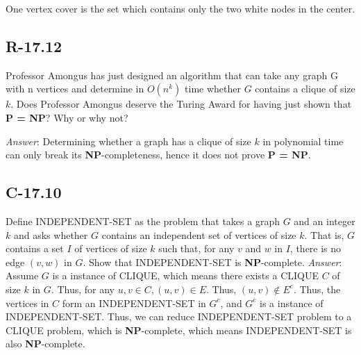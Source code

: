 \documentclass[11pt]{article}
\begin{document}
One vertex cover is the set which contains only the two white nodes in the center.
\subsection{R-17.12}
Professor Amongus has just designed an algorithm that can take any graph G with n vertices and determine in $O(n^k)$ time whether $G$ contains a clique of size $k$. Does Professor Amongus deserve the Turing Award for having just shown that \textbf{P = NP}? Why or why not?

\noindent \emph{Answer}: Determining whether a graph has a clique of size $k$ in polynomial time can only break its \textbf{NP}-completeness, hence it does not prove \textbf{P = NP}.
\subsection{C-17.10}
Define INDEPENDENT-SET as the problem that takes a graph $G$ and an integer $k$ and asks whether $G$ contains an independent set of vertices of size $k$. That is, $G$ contains a set $I$ of vertices of size $k$ such that, for any $v$ and $w$ in $I$, there is no edge $(v,w)$ in $G$. Show that INDEPENDENT-SET is \textbf{NP}-complete.
\noindent \emph{Answer}: Assume $G$ is a instance of CLIQUE, which means there exists a CLIQUE $C$ of size $k$ in $G$. Thus, for any $u,v\in C, (u,v)\in E$. Thus, $(u,v)\not\in E^c$. Thus, the vertices in $C$ form an INDEPENDENT-SET in $G^c$, and $G^c$ is a instance of INDEPENDENT-SET. Thus, we can reduce INDEPENDENT-SET problem to a CLIQUE problem, which is \textbf{NP}-complete, which means INDEPENDENT-SET is also \textbf{NP}-complete.
\end{document}
